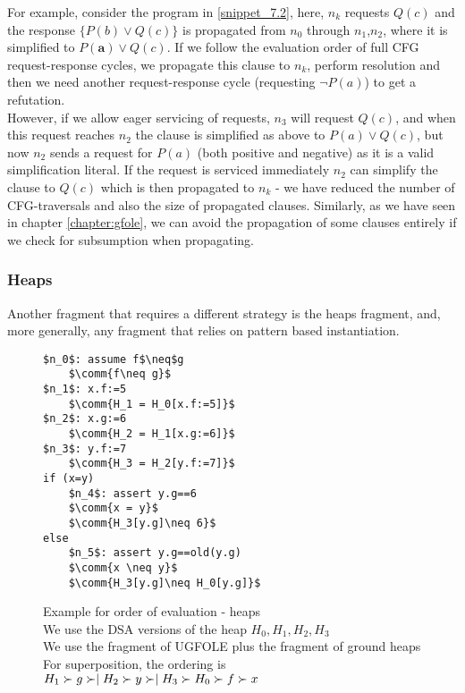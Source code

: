 For example, consider the program in \ref{snippet_7.2}, 
here, $n_k$ requests $Q(c)$ and the response $\{P(b) \lor Q(c)\}$ is propagated from $n_0$ through $n_1$,$n_2$, where it is simplified to $P(\mathbf{a}) \lor Q(c)$. If we follow the evaluation order of full CFG request-response cycles,
we propagate this clause to $n_k$, perform resolution and then we need another request-response cycle (requesting $\lnot P(a)$) to get a refutation.\\
However, if we allow eager servicing of requests, $n_3$ will request $Q(c)$, and when this request reaches $n_2$ the clause is simplified as above to $P(a) \lor Q(c)$, but now $n_2$ sends a request for $P(a)$ (both positive and negative) as it is a valid simplification literal.
If the request is serviced immediately $n_2$ can simplify the clause to $Q(c)$ which is then propagated to $n_k$ - we have reduced the number of CFG-traversals and also the size of propagated clauses. Similarly, as we have seen in chapter \ref{chapter:gfole}, we can avoid the propagation of some clauses entirely if we check for subsumption when propagating.

\subsubsection*{Heaps}\label{section:heaps}
Another fragment that requires a different strategy is the heaps fragment, and, more generally, any fragment that relies on pattern based instantiation.

\begin{figure}
\begin{lstlisting}
$n_0$: assume f$\neq$g
	$\comm{f\neq g}$
$n_1$: x.f:=5 
	$\comm{H_1 = H_0[x.f:=5]}$
$n_2$: x.g:=6 
	$\comm{H_2 = H_1[x.g:=6]}$
$n_3$: y.f:=7 
	$\comm{H_3 = H_2[y.f:=7]}$
if (x=y)
	$n_4$: assert y.g==6 
	$\comm{x = y}$
	$\comm{H_3[y.g]\neq 6}$
else
	$n_5$: assert y.g==old(y.g)
	$\comm{x \neq y}$
	$\comm{H_3[y.g]\neq H_0[y.g]}$
\end{lstlisting}
\caption{Example for order of evaluation - heaps\\
We use the DSA versions of the heap $H_0,H_1,H_2,H_3$\\
We use the fragment of UGFOLE plus the fragment of ground heaps\\
For superposition, the ordering is \\
$H_1 \succ g \succ\mid H_2 \succ y \succ\mid H_3 \succ H_0 \succ f \succ x$
}
\label{snippet_7.3}
\end{figure}

